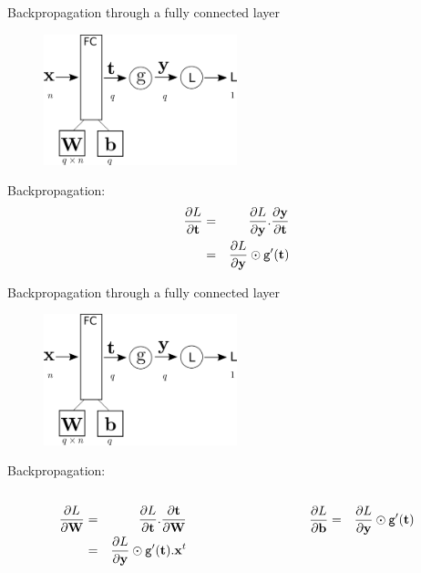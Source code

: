 \documentclass[xcolor=pdftex,dvipsnames,table,mathserif]{beamer}
\begin{document}
\begin{frame}{Backpropagation through a fully connected layer}
  \begin{figure}
    \includegraphics[width=0.5\textwidth]{../graphics/bp_fc.png}
  \end{figure}

  Backpropagation:
  \begin{eqnarray*}
    \pdv{L}{\mathbf{t}} &=& \pdv{L}{\mathbf{y}}.\pdv{\mathbf{y}}{\mathbf{t}} \\
                           &=& \pdv{L}{\mathbf{y}} \odot \texttt{g}'(\mathbf{t}) \\
  \end{eqnarray*}

\end{frame}

\begin{frame}{Backpropagation through a fully connected layer}
  \begin{figure}
    \includegraphics[width=0.5\textwidth]{../graphics/bp_fc.png}
  \end{figure}

  Backpropagation:
  \begin{columns}
    \begin{column}{.5\textwidth}
      \begin{eqnarray*}
        \pdv{L}{\mathbf{W}} &=& \pdv{L}{\mathbf{t}}.\pdv{\mathbf{t}}{\mathbf{W}} \\
                   &=& \pdv{L}{\mathbf{y}} \odot \texttt{g}'(\mathbf{t}).\mathbf{x}^t
      \end{eqnarray*}
    \end{column}

  \begin{column}{.5\textwidth}
  \begin{eqnarray*}
    \pdv{L}{\mathbf{b}} &=&  \pdv{L}{\mathbf{y}} \odot \texttt{g}'(\mathbf{t})
  \end{eqnarray*}
  \end{column}
\end{columns}


\end{frame}
\end{document}
